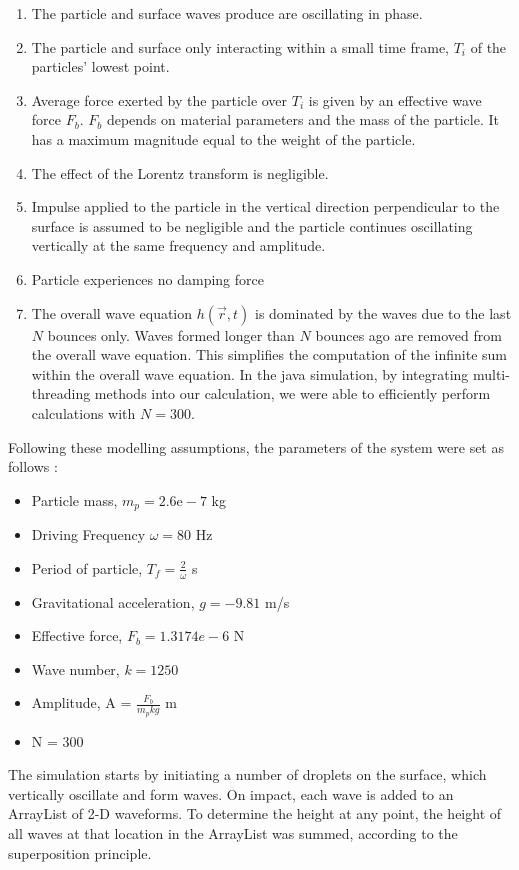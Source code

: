 \begin{enumerate}
\item The particle and surface waves produce are oscillating in phase.
\item The particle and surface only interacting within a small time frame, $T_i$ of the particles' lowest point.
\item Average force exerted by the particle over $T_i$ is given by an effective wave force $F_b$. $F_b$ depends on material parameters and the mass of the particle. It has a maximum magnitude equal to the weight of the particle.
\item The effect of the Lorentz transform is negligible.
\item Impulse applied to the particle in the vertical direction perpendicular to the surface is assumed to be negligible and the particle continues oscillating vertically at the same frequency and amplitude. 
\item Particle experiences no damping force
\item The overall wave equation $h(\vec{r} , t)$ is dominated by the waves due to the last $N$ bounces only. Waves formed longer than $N$ bounces ago are removed from the overall wave equation. This simplifies the computation of the infinite sum within the overall wave equation. In the java simulation, by integrating multi-threading methods into our calculation, we were able to efficiently perform calculations with $N = 300$.
\end{enumerate}

Following these modelling assumptions, the parameters of the system were set as follows \cite{Dotwave}:

\begin{itemize}
\item Particle mass, $m_p = 2.6\textrm{e}-7$ kg
\item Driving Frequency $\omega= 80$ Hz
\item Period of particle, $T_f = \frac{2}{\omega}$ s
\item Gravitational acceleration, $g = -9.81$ m/s
\item Effective force, $F_b = 1.3174e-6$ N
\item Wave number, $k = 1250$
\item Amplitude, A = $\frac{F_b}{m_pkg}$ m
\item N = 300
\end{itemize}

The simulation starts by initiating a number of droplets on the surface, which vertically oscillate and form waves. On impact, each wave is added to an ArrayList of 2-D waveforms. To determine the height at any point, the height of all waves at that location in the ArrayList was summed, according to the superposition principle.

